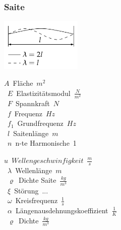 \subsubsection{Saite}

\begin{center}
	\begin{minipage}{0.35\textwidth}
	\end{minipage}%
	\begin{minipage}{0.15\textwidth}
		\includegraphics[height=2.5cm,right,keepaspectratio=true]{Images/eigenschwingung_saite.png}
	\end{minipage}
\end{center}
\begin{center}
	\begin{minipage}{0.25\textwidth}
		\unit{$A$}{Fläche}{$m^2$}\\
		\unit{$E$}{Elastizitätsmodul}{$\frac{N}{m^2}$}\\
		\unit{$F$}{Spannkraft}{$N$}\\
		\unit{$f$}{Frequenz}{$Hz$}\\
		\unit{$f_1$}{Grundfrequenz}{$Hz$}\\
		\unit{$l$}{Saitenlänge}{$m$}\\
		\unit{$n$}{n-te Harmonische}{1}\\
	\end{minipage}%
	\begin{minipage}{0.25\textwidth}
		\unit{$u$}{$Wellengeschwinfigkeit$}{$\frac{m}{s}$}\\
		\unit{$\lambda$}{Wellenlänge}{$m$}\\
		\unit{$\varrho$}{Dichte Saite}{$\frac{kg}{m^3}$}\\
		\unit{$\xi$}{Störung}{$...$}\\
		\unit{$\omega$}{Kreisfrequenz}{$\frac{1}{s}$}\\
		\unit{$\alpha$}{Längenausdehnungskoeffizient}{$\frac{1}{K}$}\\
		\unit{$\varrho$}{Dichte}{$\frac{kg}{m^3}$}
	\end{minipage}
\end{center}




